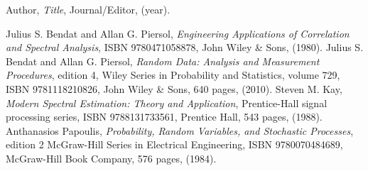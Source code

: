 \documentclass{article}
\theoremstyle{definition}
\theoremstyle{remark}
\begin{document}
\begin{thebibliography}{99}

 Author, \emph{Title}, Journal/Editor, (year).

 Julius S. Bendat and Allan G. Piersol, 
                     \emph{Engineering Applications of Correlation and Spectral Analysis}, 
                     ISBN 9780471058878, John Wiley \& Sons, (1980).
 Julius S. Bendat and Allan G. Piersol, 
                     \emph{Random Data: Analysis and Measurement Procedures}, edition 4,
                     {Wiley Series in Probability and Statistics}, volume 729,
                     ISBN 9781118210826, John Wiley \& Sons, 640 pages, (2010).
    Steven M. Kay,
                     \emph{Modern Spectral Estimation: Theory and Application},
                     Prentice-Hall signal processing series,
                     ISBN 9788131733561, Prentice Hall, 543 pages, (1988).
 {Anthanasios Papoulis},
                     \emph{Probability, Random Variables, and Stochastic Processes}, edition 2
                     {McGraw-Hill Series in Electrical Engineering},
                     ISBN {9780070484689}, {McGraw-Hill Book Company}, 576 pages, (1984).

\end{thebibliography}
\end{document}
